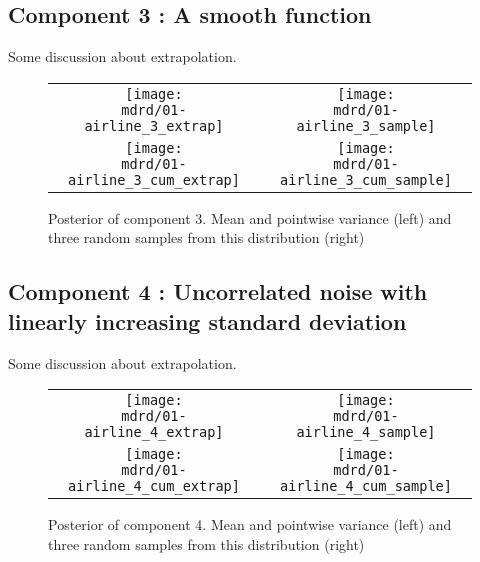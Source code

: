 \documentclass{article} %
\begin{document}
\subsection{Component 3 : A smooth function}

Some discussion about extrapolation.

\begin{figure}[H]
\newcommand{\wmgd}{0.5\columnwidth}
\newcommand{\hmgd}{3.0cm}
\newcommand{\mdrd}{figures/01-airline}
\newcommand{\mbm}{\hspace{-0.3cm}}
\begin{tabular}{cc}
\mbm \texttt{[image: \\mdrd/01-airline\_3\_extrap]} & \texttt{[image: \\mdrd/01-airline\_3\_sample]} \\
\mbm \texttt{[image: \\mdrd/01-airline\_3\_cum\_extrap]} & \texttt{[image: \\mdrd/01-airline\_3\_cum\_sample]}
\end{tabular}
\caption{Posterior of component 3. Mean and pointwise variance (left) and three random samples from this distribution (right)}
\label{fig:extrap3}
\end{figure}

\subsection{Component 4 : Uncorrelated noise with linearly increasing standard deviation}

Some discussion about extrapolation.

\begin{figure}[H]
\newcommand{\wmgd}{0.5\columnwidth}
\newcommand{\hmgd}{3.0cm}
\newcommand{\mdrd}{figures/01-airline}
\newcommand{\mbm}{\hspace{-0.3cm}}
\begin{tabular}{cc}
\mbm \texttt{[image: \\mdrd/01-airline\_4\_extrap]} & \texttt{[image: \\mdrd/01-airline\_4\_sample]} \\
\mbm \texttt{[image: \\mdrd/01-airline\_4\_cum\_extrap]} & \texttt{[image: \\mdrd/01-airline\_4\_cum\_sample]}
\end{tabular}
\caption{Posterior of component 4. Mean and pointwise variance (left) and three random samples from this distribution (right)}
\label{fig:extrap4}
\end{figure}
\end{document}
